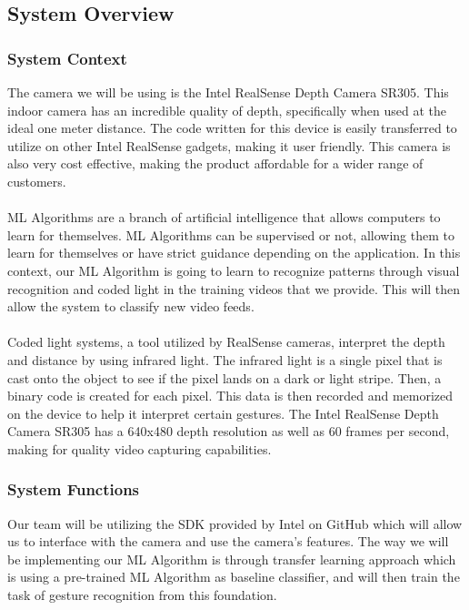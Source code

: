 \documentclass[onecolumn, draftclsnofoot,10pt, compsoc]{IEEEtran}
\begin{document}
\subsection{System Overview}

\subsubsection{System Context}
The camera we will be using is the Intel RealSense Depth Camera SR305.
This indoor camera has an incredible quality of depth, specifically when used at the ideal one meter distance.
The code written for this device is easily transferred to utilize on other Intel RealSense gadgets, making it user friendly. 
This camera is also very cost effective, making the product affordable for a wider range of customers.
\\
\\
ML Algorithms are a branch of artificial intelligence that allows computers to learn for themselves. 
ML Algorithms can be supervised or not, allowing them to learn for themselves or have strict guidance depending on the application. 
In this context, our ML Algorithm is going to learn to recognize patterns through visual recognition and coded light in the training videos that we provide.
This will then allow the system to classify new video feeds. 
\\
\\
Coded light systems, a tool utilized by RealSense cameras, interpret the depth and distance by using infrared light.
The infrared light is a single pixel that is cast onto the object to see if the pixel lands on a dark or light stripe.
Then, a binary code is created for each pixel.
This data is then recorded and memorized on the device to help it interpret certain gestures.
The Intel RealSense Depth Camera SR305 has a 640x480 depth resolution as well as 60 frames per second, making for quality video capturing capabilities\cite{first}.

\subsubsection{System Functions}
Our team will be utilizing the SDK provided by Intel on GitHub which will allow us to interface with the camera and use the camera’s features. 
The way we will be implementing our ML Algorithm is through transfer learning approach which is using a pre-trained ML Algorithm as baseline classifier, and will then train the task of gesture recognition from this foundation. 
\end{document}
